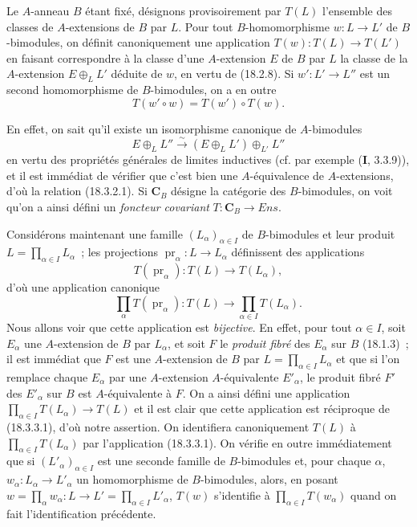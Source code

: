 \begin{env}[18.3.2]
\label{0.18.3.2-fr}
Le $A$-anneau $B$ étant fixé, désignons provisoirement par $T(L)$ l'ensemble
des classes de $A$-extensions de $B$ par $L$. Pour tout $B$-homomorphisme
$w:L\to L'$ de $B$-bimodules, on définit canoniquement une application
$T(w):T(L)\to T(L')$ en faisant correspondre à la classe d'une $A$-extension
$E$ de $B$ par $L$ la classe de la $A$-extension $E\oplus_LL'$ déduite de
$w$, en vertu de (18.2.8). Si $w':L'\to L''$ est un second homomorphisme
de $B$-bimodules, on a en outre
\begin{equation}
\label{0.18.3.2.1-fr}
\tag{18.3.2.1}
  T(w'\circ w)=T(w')\circ T(w).
\end{equation}

En effet, on sait qu'il existe un isomorphisme canonique de $A$-bimodules
\[
  E\oplus_LL''\xrightarrow{\sim}(E\oplus_LL')\oplus_{L'}L''
\]
en vertu des propriétés générales de limites inductives (cf. par exemple
(\textbf{I}, 3.3.9)), et il est immédiat de vérifier que c'est bien une
$A$-équivalence de $A$-extensions, d'où
la relation (18.3.2.1). Si $\boldsymbol{C}_B$ désigne la catégorie des
$B$-bimodules, on voit qu'on a ainsi défini un \emph{foncteur covariant}
$T:\boldsymbol{C}_B\to\boldsymbol{\mathit{Ens}}$.
\end{env}

\begin{env}[18.3.3]
\label{0.18.3.3-fr}
Considérons maintenant une famille $(L_\alpha)_{\alpha\in I}$ de
$B$-bimodules et leur produit $L=\prod_{\alpha\in I}L_\alpha$~; les
projections $\operatorname{pr}_\alpha:L\to L_\alpha$ définissent des
applications
\[
  T(\operatorname{pr}_\alpha):T(L)\to T(L_\alpha),
\]
d'où une application canonique
\begin{equation}
\label{0.18.3.3.1-fr}
\tag{18.3.3.1}
  \prod_\alpha T(\operatorname{pr}_\alpha):T(L)
  \longrightarrow\prod_{\alpha\in I}T(L_\alpha).
\end{equation}
Nous allons voir que cette application est \emph{bijective}. En effet, pour
tout $\alpha\in I$, soit $E_\alpha$ une $A$-extension de $B$ par $L_\alpha$,
et soit $F$ le \emph{produit fibré} des $E_\alpha$ sur $B$ (18.1.3)~; il est
immédiat que $F$ est une $A$-extension de $B$ par
$L=\prod_{\alpha\in I}L_\alpha$ et que si l'on remplace chaque $E_\alpha$ par
une $A$-extension $A$-équivalente $E'_\alpha$, le produit fibré $F'$ des
$E'_\alpha$ sur $B$ est $A$-équivalente à $F$. On a ainsi défini une
application $\prod_{\alpha\in I}T(L_\alpha)\to T(L)$ et il est clair que cette
application est réciproque de (18.3.3.1), d'où notre assertion. On identifiera
canoniquement $T(L)$ à $\prod_{\alpha\in I}T(L_\alpha)$ par l'application
(18.3.3.1). On vérifie en outre immédiatement que si
$(L'_\alpha)_{\alpha\in I}$ est une seconde famille de $B$-bimodules et, pour
chaque $\alpha$, $w_\alpha:L_\alpha\to L'_\alpha$ un homomorphisme de
$B$-bimodules, alors, en posant
$w=\prod_\alpha w_\alpha:L\to L'=\prod_{\alpha\in I}L'_\alpha$, $T(w)$
s'identifie à $\prod_{\alpha\in I}T(w_\alpha)$ quand on fait l'identification
précédente.
\end{env}

